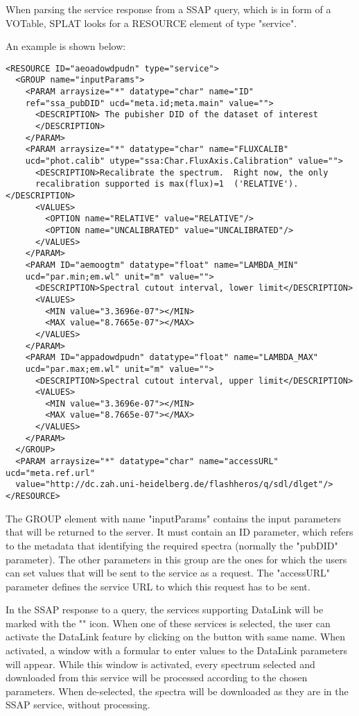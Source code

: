 \documentclass[final,authoryear,5p,times,twocolumn]{elsarticle}
\begin{document}
When parsing the service response from a SSAP query, which is in form
of a VOTable, SPLAT looks for a RESOURCE element of type "service".

An example is shown below:

{\tiny
\begin{minipage}{\textwidth}
\begin{verbatim}
<RESOURCE ID="aeoadowdpudn" type="service">
  <GROUP name="inputParams">
    <PARAM arraysize="*" datatype="char" name="ID"
    ref="ssa_pubDID" ucd="meta.id;meta.main" value="">
      <DESCRIPTION> The pubisher DID of the dataset of interest
      </DESCRIPTION>
    </PARAM>
    <PARAM arraysize="*" datatype="char" name="FLUXCALIB"
    ucd="phot.calib" utype="ssa:Char.FluxAxis.Calibration" value="">
      <DESCRIPTION>Recalibrate the spectrum.  Right now, the only
      recalibration supported is max(flux)=1  ('RELATIVE').</DESCRIPTION>
      <VALUES>
        <OPTION name="RELATIVE" value="RELATIVE"/>
        <OPTION name="UNCALIBRATED" value="UNCALIBRATED"/>
      </VALUES>
    </PARAM>
    <PARAM ID="aemoogtm" datatype="float" name="LAMBDA_MIN"
    ucd="par.min;em.wl" unit="m" value="">
      <DESCRIPTION>Spectral cutout interval, lower limit</DESCRIPTION>
      <VALUES>
        <MIN value="3.3696e-07"></MIN>
        <MAX value="8.7665e-07"></MAX>
      </VALUES>
    </PARAM>
    <PARAM ID="appadowdpudn" datatype="float" name="LAMBDA_MAX"
    ucd="par.max;em.wl" unit="m" value="">
      <DESCRIPTION>Spectral cutout interval, upper limit</DESCRIPTION>
      <VALUES>
        <MIN value="3.3696e-07"></MIN>
        <MAX value="8.7665e-07"></MAX>
      </VALUES>
    </PARAM>
  </GROUP>
  <PARAM arraysize="*" datatype="char" name="accessURL" ucd="meta.ref.url"
  value="http://dc.zah.uni-heidelberg.de/flashheros/q/sdl/dlget"/>
</RESOURCE>
\end{verbatim}

\end{minipage}
}

The GROUP element with name "inputParams" contains the input
parameters that will be returned to the server.  It must contain an ID
parameter, which refers to the metadata that identifying the required
spectra (normally the "pubDID" parameter).  The other parameters in
this group are the ones for which the users can set values that will
be sent to the service as a request. The "accessURL" parameter defines
the service URL to which this request has to be sent.

In the SSAP response to a query, the services supporting DataLink will
be marked with the  ""  icon. When one of these services is
selected, the user can activate the DataLink feature by clicking on
the button with same name. When activated, a window with a formular to
enter values to the DataLink parameters will appear. While this window
is activated, every spectrum selected and downloaded from this service
will be processed according to the chosen parameters. When
de-selected, the spectra will be downloaded as they are in the SSAP
service, without processing.
\end{document}
